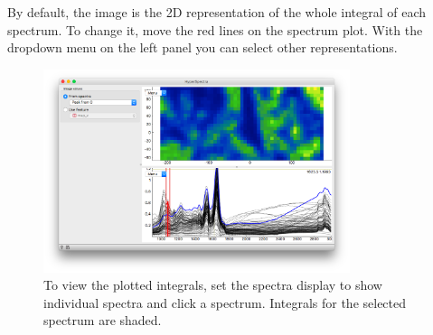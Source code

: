 By default, the image is the 2D representation of the whole integral of each spectrum. To change  it, move the red lines on the spectrum plot. With the dropdown menu on the left panel you can select other representations.

\begin{figure}[h]
    \centering
    \includegraphics[width=0.8\textwidth]{hyperspectral-fig3.png}
    \caption{To view the plotted integrals, set the spectra display to show individual spectra and click a spectrum. Integrals for the selected spectrum are shaded.}
    \label{fig:hyper_basic-fig3}
\end{figure}
